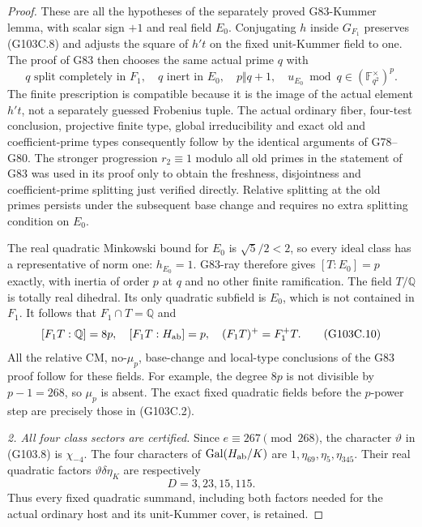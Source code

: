 \begin{proof}
These are all the hypotheses of the separately proved
G83-Kummer lemma, with scalar sign $+1$ and real field $E_0$.
Conjugating $h$ inside $G_{F_1}$ preserves (G103C.8) and adjusts
the square of $h't$ on the fixed unit-Kummer field to one.
The proof of G83 then chooses the same actual prime $q$ with
\[
 q\text{ split completely in }F_1,\quad
 q\text{ inert in }E_0,\quad p\Vert q+1,
 \quad u_{E_0}\bmod q\in(\mathbb F_{q^2}^{\times})^p.
                                                        \tag{G103C.9}
\]
The finite prescription is compatible because it is the image of
the actual element $h't$, not a separately guessed Frobenius tuple.
The actual ordinary fiber, four-test conclusion, projective finite
type, global irreducibility and exact old and coefficient-prime
types consequently follow by the identical arguments of G78--G80.
The stronger progression $r_2\equiv1$ modulo all old primes in the
statement of G83 was used in its proof only to obtain the freshness,
disjointness and coefficient-prime splitting just verified directly.
Relative splitting at the old primes persists under the subsequent
base change and requires no extra splitting condition on $E_0$.

The real quadratic Minkowski bound for $E_0$ is
$\sqrt5/2<2$, so every ideal class has a representative of norm one:
$h_{E_0}=1$.  G83-ray therefore gives $[T:E_0]=p$ exactly,
with inertia of order $p$ at $q$ and no other finite ramification.
The field $T/\mathbb Q$ is totally real dihedral.  Its only quadratic
subfield is $E_0$, which is not contained in $F_1$.
It follows that $F_1\cap T=\mathbb Q$ and
\[
 [F_1T:\mathbb Q]=8p,\quad [F_1T:H_{\rm ab}]=p,
 \quad (F_1T)^+=F_1^+T.                           \tag{G103C.10}
\]
All the relative CM, no-$\mu_p$, base-change and local-type
conclusions of the G83 proof follow for these fields.
For example, the degree $8p$ is not divisible by $p-1=268$,
so $\mu_p$ is absent.  The exact fixed quadratic fields before
the $p$-power step are precisely those in (G103C.2).

\emph{2. All four class sectors are certified.}
Since $e\equiv267\pmod{268}$, the character $\vartheta$ in
(G103.8) is $\chi_{-4}$.
The four characters of $\operatorname{Gal}(H_{\rm ab}/K)$ are
$1,\eta_{69},\eta_5,\eta_{345}$.
Their real quadratic factors $\vartheta\delta\eta_K$ are respectively
\[
                           D=3, 23, 15, 115.       \tag{G103C.11}
\]
Thus every fixed quadratic summand, including both factors needed
for the actual ordinary host and its unit-Kummer cover, is retained.


\end{proof}
